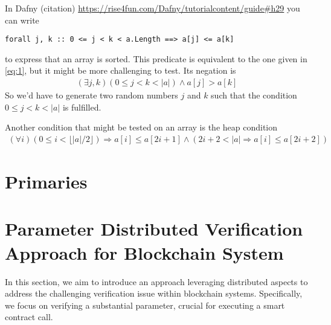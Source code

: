 \documentclass[runningheads]{llncs}
\begin{document}

In Dafny (citation) \url{https://rise4fun.com/Dafny/tutorialcontent/guide#h29} you can
write
\begin{lstlisting}
forall j, k :: 0 <= j < k < a.Length ==> a[j] <= a[k]
\end{lstlisting}
to express that an array is sorted. This predicate is equivalent to the one given in
\eqref{eq:1}, but it might be more challenging to test. Its negation is
\begin{gather}
  \label{eq:2}
  (\exists j, k ) (0\le j< k < |a|) \wedge a[j] > a[k]
\end{gather}
So we'd have to generate two random numbers $j$ and $k$ such that the condition $0 \le
j < k < |a|$ is fulfilled.


Another condition that might be tested on an array is the heap condition
\begin{gather}
  \label{eq:3}
  (\forall i) (0 \le i < \lfloor|a|/2\rfloor) \Rightarrow a[i] \le a[2i+1] \wedge (2i+2
  < |a| \Rightarrow a[i] \le a[2i+2])
\end{gather}

\section{Primaries}
\label{sec:primaries}

\section{Parameter Distributed Verification Approach for Blockchain System}
\label{sec:approach}
In this section, we aim to introduce an approach leveraging distributed aspects to address the challenging verification issue within blockchain systems. Specifically, we focus on verifying a substantial parameter, crucial for executing a smart contract call.
\end{document}
